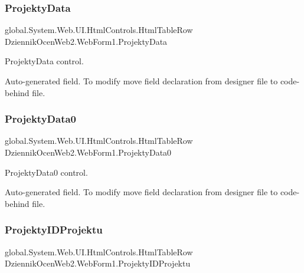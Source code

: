 \subsubsection{\texorpdfstring{Projekty\+Data}{ProjektyData}}
{\footnotesize\ttfamily global.\+System.\+Web.\+U\+I.\+Html\+Controls.\+Html\+Table\+Row Dziennik\+Ocen\+Web2.\+Web\+Form1.\+Projekty\+Data\hspace{0.3cm}{\ttfamily [protected]}}



Projekty\+Data control. 

Auto-\/generated field. To modify move field declaration from designer file to code-\/behind file. \mbox{\label{class_dziennik_ocen_web2_1_1_web_form1_a041f44ddf339d8b10a89bfcad55a58a7}} 
\subsubsection{\texorpdfstring{Projekty\+Data0}{ProjektyData0}}
{\footnotesize\ttfamily global.\+System.\+Web.\+U\+I.\+Html\+Controls.\+Html\+Table\+Row Dziennik\+Ocen\+Web2.\+Web\+Form1.\+Projekty\+Data0\hspace{0.3cm}{\ttfamily [protected]}}



Projekty\+Data0 control. 

Auto-\/generated field. To modify move field declaration from designer file to code-\/behind file. \mbox{\label{class_dziennik_ocen_web2_1_1_web_form1_a2d974557e638f29db410389b93af4cf3}} 
\subsubsection{\texorpdfstring{Projekty\+I\+D\+Projektu}{ProjektyIDProjektu}}
{\footnotesize\ttfamily global.\+System.\+Web.\+U\+I.\+Html\+Controls.\+Html\+Table\+Row Dziennik\+Ocen\+Web2.\+Web\+Form1.\+Projekty\+I\+D\+Projektu\hspace{0.3cm}{\ttfamily [protected]}}



